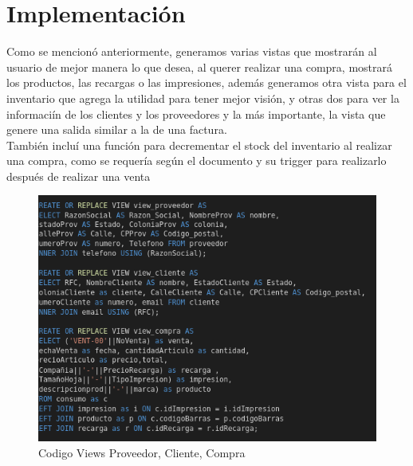 \documentclass[letter,12pt]{article}
\begin{document}
\section{Implementaci\'on}
Como se mencionó anteriormente, generamos varias vistas que mostrarán al usuario de mejor manera lo que desea, al querer realizar una compra, mostrará los productos, las recargas o las impresiones, además generamos otra vista para el inventario que agrega la utilidad para tener mejor visión, y otras dos para ver la informaciín de los clientes y los proveedores y la más importante, la vista que genere una salida similar a la de una factura. \\
También incluí una función para decrementar el stock del inventario al realizar una compra, como se requería según el documento y su trigger para realizarlo después de realizar una venta
\begin{center}
\begin{figure}[H]
\includegraphics[scale=.8]{viewProveedorClienteCompra.png}
\caption{Codigo Views Proveedor, Cliente, Compra}
\end{figure}


\end{center}
\end{document}
